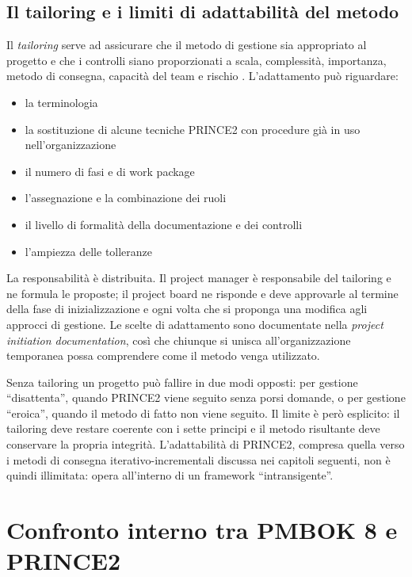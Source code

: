 \subsection{Il tailoring e i limiti di adattabilit\`a del metodo}

Il \emph{tailoring} serve ad assicurare che il metodo di gestione
sia appropriato al progetto e che i controlli siano proporzionati a scala,
complessit\`a, importanza, metodo di consegna, capacit\`a del team e rischio
\cite{prince27}. L'adattamento pu\`o riguardare:
\begin {itemize}
\item la terminologia
\item la sostituzione di alcune tecniche PRINCE2 con procedure gi\`a in uso
nell'organizzazione
\item il numero di fasi e di work package
\item l'assegnazione e la combinazione dei ruoli
\item il livello di formalit\`a della documentazione e dei controlli
\item l'ampiezza delle tolleranze
\end {itemize}

La responsabilit\`a \`e distribuita. Il project manager \`e responsabile del
tailoring e ne formula le proposte; il project board ne risponde e deve approvarle
al termine della
fase di inizializzazione e ogni volta che si proponga una modifica agli approcci
di gestione. Le scelte di adattamento sono documentate nella \emph{project
initiation documentation}, cos\`i che chiunque si unisca all'organizzazione
temporanea possa comprendere come il metodo venga utilizzato.

Senza tailoring un progetto pu\`o fallire in due modi opposti: per gestione
``disattenta'', quando PRINCE2 viene seguito senza porsi domande, o per gestione
``eroica'', quando il metodo di fatto non viene seguito. Il limite \`e per\`o
esplicito: il tailoring deve restare coerente con i sette principi e il metodo
risultante deve conservare la propria integrit\`a. L'adattabilit\`a di PRINCE2,
compresa quella verso i metodi di consegna iterativo-incrementali discussa nei
capitoli seguenti, non \`e quindi illimitata: opera all'interno di un framework
``intransigente''.

\section{Confronto interno tra PMBOK 8 e PRINCE2}

